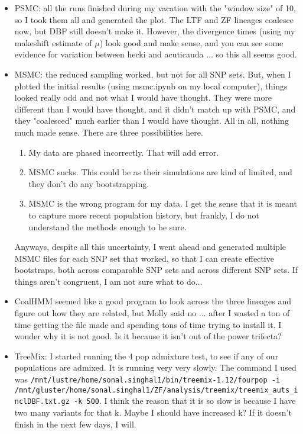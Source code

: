 \documentclass[idxtotoc,hyperref,openany,oneside]{labbook} %
\begin{document}
\begin{itemize}
\item PSMC: all the runs finished during my vacation with the "window size" of 10, so I took them all and generated the plot. The LTF and ZF lineages coalesce now, but DBF still doesn't make it. However, the divergence times (using my makeshift estimate of $\mu$) look good and make sense, and you can see some evidence for variation between hecki and acuticauda ... so this all seems good.
\item MSMC: the reduced sampling worked, but not for all SNP sets. But, when I plotted the initial results (using msmc.ipynb on my local computer), things looked really odd and not what I would have thought. They were more different than I would have thought, and it didn't match up with PSMC, and they "coalesced" much earlier than I would have thought. All in all, nothing much made sense. There are three possibilities here.
\begin{enumerate}
\item My data are phased incorrectly. That will add error.
\item MSMC sucks. This could be as their simulations are kind of limited, and they don't do any bootstrapping.
\item MSMC is the wrong program for my data. I get the sense that it is meant to capture more recent population history, but frankly, I do not understand the methods enough to be sure.
\end{enumerate}
Anyways, despite all this uncertainty, I went ahead and generated multiple MSMC files for each SNP set that worked, so that I can create effective bootstraps, both across comparable SNP sets and across different SNP sets. If things aren't congruent, I am not sure what to do...
\item CoalHMM seemed like a good program to look across the three lineages and figure out how they are related, but Molly said no ... after I wasted a ton of time getting the file made and spending tons of time trying to install it. I wonder why it is not good. Is it because it isn't out of the power trifecta?
\item TreeMix: I started running the 4 pop admixture test, to see if any of our populations are admixed. It is running very very slowly. The command I used was \verb+/mnt/lustre/home/sonal.singhal1/bin/treemix-1.12/fourpop -i /mnt/gluster/home/sonal.singhal1/ZF/analysis/treemix/treemix_auts_inclDBF.txt.gz -k 500+. I think the reason that it is so slow is because I have two many variants for that k. Maybe I should have increased k? If it doesn't finish in the next few days, I will.

\end{itemize}
\end{document}
